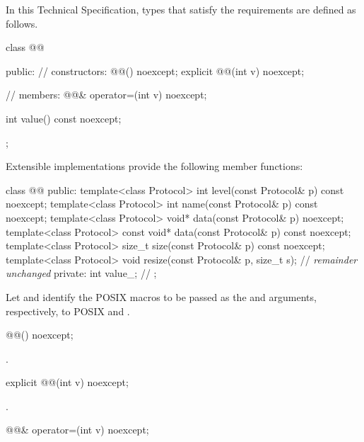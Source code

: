 \pnum
In this Technical Specification, types that satisfy the  requirements are defined as follows.

\begin{codeblock}
class @@
{
public:
  // constructors:
  @@() noexcept;
  explicit @@(int v) noexcept;

  // members:
  @@& operator=(int v) noexcept;

  int value() const noexcept;
};
\end{codeblock}

%
\pnum
Extensible implementations provide the following member functions:

\begin{codeblock}
class @@
{
public:
  template<class Protocol> int level(const Protocol& p) const noexcept;
  template<class Protocol> int name(const Protocol& p) const noexcept;
  template<class Protocol> void* data(const Protocol& p) noexcept;
  template<class Protocol> const void* data(const Protocol& p) const noexcept;
  template<class Protocol> size_t size(const Protocol& p) const noexcept;
  template<class Protocol> void resize(const Protocol& p, size_t s);
  // \textit{remainder unchanged}
private:
  int value_; // \expos
};
\end{codeblock}

\pnum
Let  and  identify the POSIX macros to be passed as the  and  arguments, respectively, to POSIX  and .

\begin{itemdecl}
@@() noexcept;
\end{itemdecl}

\begin{itemdescr}
\pnum
\postconditions {}.
\end{itemdescr}

\begin{itemdecl}
explicit @@(int v) noexcept;
\end{itemdecl}

\begin{itemdescr}
\pnum
\postconditions {}.
\end{itemdescr}

\begin{itemdecl}
@@& operator=(int v) noexcept;
\end{itemdecl}


